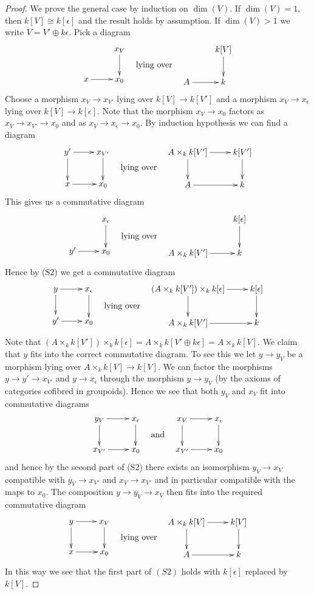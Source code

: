 \documentclass{stacks-project}
\theoremstyle{plain}
\theoremstyle{definition}
\theoremstyle{remark}
\numberwithin{equation}{subsection}
\begin{document}
\begin{proof}
\medskip\noindent
We prove the general case by induction on $\dim(V)$. If $\dim(V) = 1$, then
$k[V] \cong k[\epsilon]$ and the result holds by assumption.
If $\dim(V) > 1$ we write $V = V' \oplus k\epsilon$. Pick a diagram
$$
\vcenter{
\xymatrix{
& x_V \ar[d] \\
x \ar[r] & x_0
}
}
\quad\text{lying over}\quad
\vcenter{
\xymatrix{
& k[V] \ar[d] \\
A \ar[r] & k
}
}
$$
Choose a morphism $x_V \to x_{V'}$ lying over $k[V] \to k[V']$
and a morphism $x_V \to x_\epsilon$ lying over $k[V] \to k[\epsilon]$.
Note that the morphism $x_V \to x_0$ factors as
$x_V \to x_{V'} \to x_0$ and as $x_V \to x_\epsilon \to x_0$.
By induction hypothesis we can find a diagram
$$
\vcenter{
\xymatrix{
y' \ar[d] \ar[r] & x_{V'} \ar[d] \\
x \ar[r] & x_0
}
}
\quad\text{lying over}\quad
\vcenter{
\xymatrix{
A \times_k k[V'] \ar[d] \ar[r] & k[V'] \ar[d] \\
A \ar[r] & k
}
}
$$
This gives us a commutative diagram
$$
\vcenter{
\xymatrix{
& x_\epsilon \ar[d] \\
y' \ar[r] & x_0
}
}
\quad\text{lying over}\quad
\vcenter{
\xymatrix{
& k[\epsilon] \ar[d] \\
A \times_k k[V'] \ar[r] & k
}
}
$$
Hence by (S2) we get a commutative diagram
$$
\vcenter{
\xymatrix{
y \ar[d] \ar[r] & x_\epsilon \ar[d] \\
y' \ar[r] & x_0
}
}
\quad\text{lying over}\quad
\vcenter{
\xymatrix{
(A \times_k k[V']) \times_k k[\epsilon] \ar[d] \ar[r] & k[\epsilon] \ar[d] \\
A \times_k k[V'] \ar[r] & k
}
}
$$
Note that
$(A \times_k k[V']) \times_k k[\epsilon] = A \times_k k[V' \oplus k\epsilon]
= A \times_k k[V]$. We claim that $y$ fits into the correct commutative
diagram. To see this we let $y \to y_V$ be a morphism lying over
$A \times_k k[V] \to k[V]$. We can factor the morphisms
$y \to y' \to x_{V'}$ and $y \to x_\epsilon$ through the morphism
$y \to y_V$ (by the axioms of categories cofibred in groupoids).
Hence we see that both $y_V$ and $x_V$ fit into commutative diagrams
$$
\vcenter{
\xymatrix{
y_V \ar[r] \ar[d] & x_\epsilon \ar[d] \\
x_{V'} \ar[r]          & x_0
}
}
\quad\text{and}\quad
\vcenter{
\xymatrix{
x_V \ar[r] \ar[d] & x_\epsilon \ar[d] \\
x_{V'} \ar[r]                 & x_0
}
}
$$
and hence by the second part of (S2) there exists an isomorphism
$y_V \to x_V$ compatible with $y_V \to x_{V'}$ and $x_V \to x_{V'}$
and in particular compatible with the maps to $x_0$.
The composition $y \to y_V \to x_V$ then fits into the required commutative
diagram
$$
\vcenter{
\xymatrix{
y \ar[r] \ar[d] & x_V \ar[d] \\
x \ar[r] & x_0
}
}
\quad\text{lying over}\quad
\vcenter{
\xymatrix{
A \times_k k[V] \ar[d] \ar[r] & k[V] \ar[d] \\
A \ar[r] & k
}
}
$$
In this way we see that the first part of $(S2)$ holds with $k[\epsilon]$
replaced by $k[V]$.


\end{proof}
\end{document}
